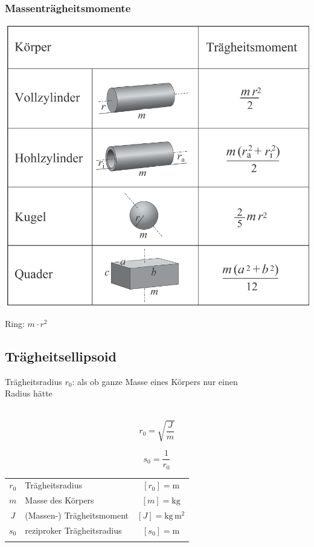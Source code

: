 		\subsubsection{Massenträgheitsmomente} %
		
			\includegraphics[width=0.8\linewidth]{Bilder/massentraegheitsmomente}

			Ring: $m \cdot r^2$

	\subsection{Trägheitsellipsoid}
		Trägheitsradius $r_0$: als ob ganze Masse eines Körpers nur einen \\
		Radius hätte \\
		\\
		\begin{minipage}{0.48\linewidth}
			$$ \boxed{ r_0 = \sqrt{\frac{J}{m}}} $$
		\end{minipage}
		\hfill
		\begin{minipage}{0.48\linewidth}
			$$ \boxed{s_0 = \frac{1}{r_0} }$$
		\end{minipage}
		
		\begin{tabular}{c l c}
			$r_0$ & Trägheitsradius & $[r_0] = \mathrm{m}$ \\
			$m$ & Masse des Körpers & $[m] = \mathrm{kg}$ \\
			$J$ & (Massen-) Trägheitsmoment & $[J] = \mathrm{kg \, m^2}$ \\
			$s_0$ & reziproker Trägheitsradius & $[s_0] = \mathrm{m}$ \\
			\\
		\end{tabular}
		
